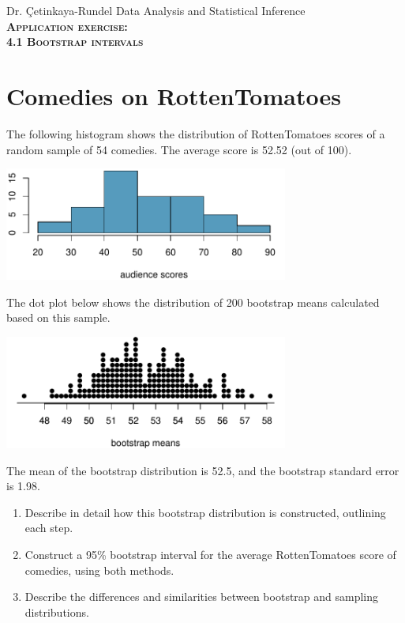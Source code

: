\documentclass[11pt]{article}
\newcommand{\ttl}[1]{ \textsc{{\LARGE \textbf{{\color{oiB} #1} } }}}
\begin{document}
Dr. \c{C}etinkaya-Rundel \hfill Data Analysis and Statistical Inference \\

\ttl{Application exercise: \\
4.1 Bootstrap intervals} 

\section*{Comedies on RottenTomatoes}

The following histogram shows the distribution of RottenTomatoes scores of a random sample of 54 comedies. The average score is 52.52 (out of 100).

\begin{center}
\includegraphics[width = 0.7\textwidth]{figures/comedy_hist}
\end{center}

The dot plot below shows the distribution of 200 bootstrap means calculated based on this sample.

\begin{center}
\includegraphics[width = 0.7\textwidth]{figures/comedy_boot_mean_dot}
\end{center}

The mean of the bootstrap distribution is 52.5, and the bootstrap standard error is  1.98.

\begin{enumerate}

\item Describe in detail how this bootstrap distribution is constructed, outlining each step.

\item Construct a 95\% bootstrap interval for the average RottenTomatoes score of comedies, using both methods.

\item Describe the differences and similarities between bootstrap and sampling distributions.

\end{enumerate}




%
\end{document}
